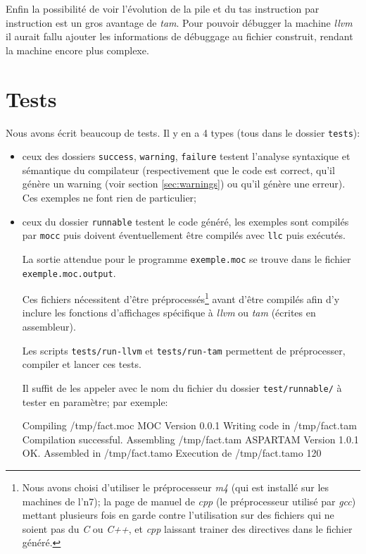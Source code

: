 \documentclass{scrartcl}
\newcommand{\mocc}{\texttt{mocc}}
\newcommand{\llvm}{\textit{llvm}}
\newcommand{\tam} {\textit{tam}}
\begin{document}
  Enfin la possibilité de voir l'évolution de la pile et du tas instruction par
  instruction est un gros avantage de \tam{}. Pour pouvoir débugger la machine
  \llvm{} il aurait fallu ajouter les informations de débuggage au fichier
  construit, rendant la machine encore plus complexe.

\section{Tests}
  Nous avons écrit beaucoup de tests. Il y en a 4 types (tous dans le
  dossier \verb+tests+):
  \begin{itemize}
    \item ceux des dossiers \verb+success+, \verb+warning+, \verb+failure+
      testent l'analyse syntaxique et sémantique du compilateur (respectivement
      que le code est correct, qu'il génère un warning (voir section
      \ref{sec:warnings}) ou qu'il génère une erreur). Ces exemples ne font
      rien de particulier;
    \item ceux du dossier \verb+runnable+ testent le code généré, les exemples
      sont compilés par \mocc{} puis doivent éventuellement être compilés avec
      \verb+llc+ puis exécutés.

      La sortie attendue pour le programme \verb+exemple.moc+ se trouve dans
      le fichier \verb+exemple.moc.output+.

      Ces fichiers nécessitent d'être préprocessés\footnote{Nous avons choisi
      d'utiliser le préprocesseur \textit{m4} (qui est installé sur les
      machines de l'n7); la page de manuel de \textit{cpp} (le préprocesseur
      utilisé par \textit{gcc}) mettant plusieurs fois en garde contre
      l'utilisation sur des
      fichiers qui ne soient pas du \textit{C} ou \textit{C++}, et \textit{cpp}
      laissant trainer des directives dans le fichier généré.} avant d'être
      compilés afin d'y inclure les fonctions d'affichages spécifique à \llvm{}
      ou \tam{} (écrites en assembleur).

      Les scripts \verb+tests/run-llvm+ et \verb+tests/run-tam+ permettent de
      préprocesser, compiler et lancer ces tests.

      Il suffit de les appeler avec le nom du fichier du dossier
      \verb+test/runnable/+ à tester en paramètre; par exemple:
      \begin{moccode}
Compiling /tmp/fact.moc
MOC Version 0.0.1
Writing code in /tmp/fact.tam
Compilation successful.
Assembling /tmp/fact.tam
ASPARTAM Version 1.0.1
OK. Assembled in /tmp/fact.tamo
Execution de /tmp/fact.tamo
120
      \end{moccode}
  \end{itemize}
\end{document}
